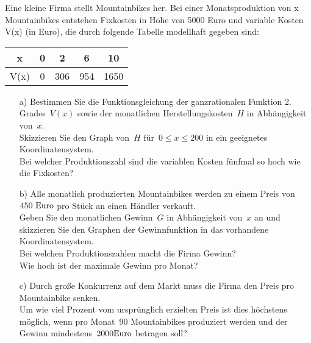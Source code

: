 		Eine kleine Firma stellt Mountainbikes her. Bei einer Monatsproduktion von x Mountainbikes entstehen Fixkosten in 	Höhe von 5000 Euro und variable Kosten V(x) (in Euro), die durch folgende Tabelle modellhaft gegeben sind:\\
		\renewcommand{\arraystretch}{1.2}
	\begin{center}
		\begin{tabular}{|c|c|c|c|c|}\hline
			x	&	0	&	2	&	6	&	10\\	\hline		%
			V(x)&	0	&	306	&	954	&	1650\\	\hline		%
		\end{tabular}
	\end{center}
		\renewcommand{\arraystretch}{1}
	\begin{itemize}
		\item[a)]Bestimmen Sie die Funktionsgleichung der ganzrationalen Funktion 2. Grades~$V(x)$ sowie der monatlichen Herstellungskosten~$H$ in Abhängigkeit von~$x$.\\
			Skizzieren Sie den Graph von~$H$ für~$0 \leqslant x \leqslant 200$ in ein geeignetes Koordinatensystem.\\
			Bei welcher Produktionszahl sind die variablen Kosten fünfmal so hoch wie die Fixkosten?\\
		\item[b)]Alle monatlich produzierten Mountainbikes werden zu einem Preis von~$450~\textnormal{Euro}$ pro Stück an einen Händler verkauft.\\
			Geben Sie den monatlichen Gewinn~$G$ in Abhängigkeit von~$x$ an und skizzieren Sie den Graphen der Gewinnfunktion in das vorhandene Koordinatensystem.\\
			Bei welchen Produktionszahlen macht die Firma Gewinn?\\
			Wie hoch ist der maximale Gewinn pro Monat?\\
		\item[c)]Durch große Konkurrenz auf dem Markt muss die Firma den Preis pro Mountainbike senken.\\
			Um wie viel Prozent vom ursprünglich erzielten Preis ist dies höchstens möglich, wenn pro Monat~$90$ Mountainbikes produziert werden und der Gewinn mindestens~$2000\textnormal{Euro}$ betragen soll?\\[0,3cm]
	\end{itemize}
